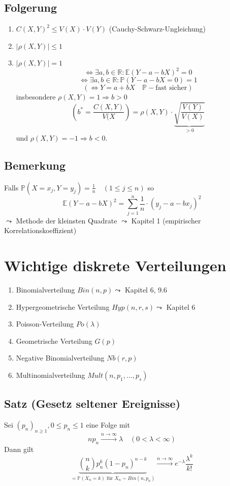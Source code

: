 \documentclass[a4paper,11pt,notitlepage]{report}
\newcommand{\R}{{\ensuremath{\mathbb{R}}}}
\newcommand{\Prim}{{\ensuremath{\mathbb{P}}}}
\newcommand{\E}{{\ensuremath{\mathbb{E}}}}
\begin{document}
\section{Folgerung}
\begin{enumerate}
	\item $C(X,Y)^2 \leq V(X) \cdot V(Y)$ (Cauchy-Schwarz-Ungleichung)
	\item $|\rho(X,Y)| \leq 1$
	\item $|\rho(X,Y)| = 1$
		$$\Leftrightarrow \exists a,b \in \R \colon \E (Y-a-bX)^2 = 0$$
		$$\Leftrightarrow \exists a,b \in \R \colon \Prim(Y-a-bX=0)=1$$
		$$(\Leftrightarrow Y=a+bX \quad \Prim-\text{fast sicher})$$
		insbesondere $\rho(X,Y)=1 \Rightarrow b>0$
		$$(b^* = \frac{C(X,Y)}{V(X}) = \rho(X,Y) \cdot \underbrace{\sqrt{\frac{V(Y)}{V(X)}}}_{>0}$$
		und $\rho(X,Y)=-1 \Rightarrow b < 0.$
\end{enumerate}

\section{Bemerkung}
Falls $\Prim(X=x_j, Y=y_j) = \frac{1}{n} \quad (1 \leq j \leq n)$ so
$$\E(Y - a -bX)^2 = \sum\limits_{j=1}^n{\frac{1}{n} \cdot (y_j - a - b x_j)^2}$$
$\leadsto$ Methode der kleinsten Quadrate $\leadsto$ Kapitel 1 (empirischer Korrelationskoeffizient)

\chapter{Wichtige diskrete Verteilungen}
\begin{enumerate}
	\item Binomialverteilung $Bin(n,p) \leadsto$ Kapitel 6, 9.6
	\item Hypergeometrische Verteilung $Hyp(n,r,s) \leadsto$ Kapitel 6
	\item Poisson-Verteilung $Po(\lambda)$
	\item Geometrische Verteilung $G(p)$
	\item Negative Binomialverteilung $Nb(r,p)$
	\item Multinomialverteilung $Mult(n,p_1, \ldots, p_s)$
\end{enumerate}

\section{Satz (Gesetz seltener Ereignisse)}
Sei $(p_n)_{n \geq 1}, 0 \leq p_n \leq 1$ eine Folge mit
$$n p_n \overset{n \rightarrow \infty}{\rightarrow} \lambda \quad (0 < \lambda < \infty)$$
Dann gilt
$$\underbrace{{n \choose k} p_n^k (1-p_n)^{n-k}}_{=\Prim(X_n = k)\text{ für }X_n \sim Bin(n, p_n)} \overset{n \rightarrow \infty}{\rightarrow} e^{-\lambda} \frac{\lambda^k}{k!}$$
\end{document}
